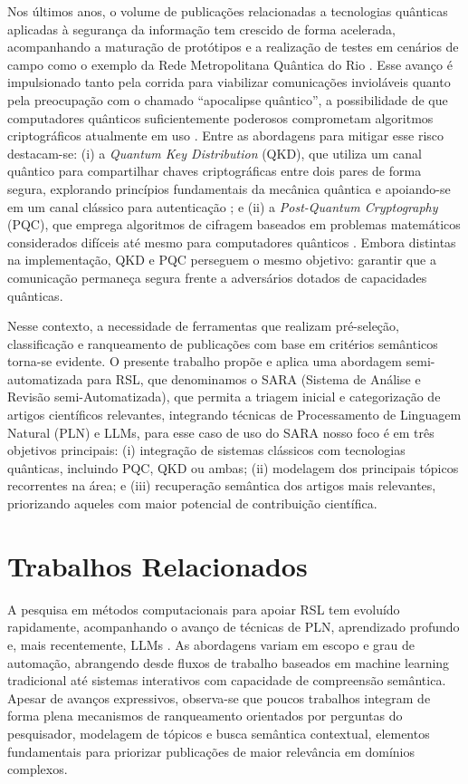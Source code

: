 \documentclass{siintec}
\begin{document}
Nos últimos anos, o volume de publicações relacionadas a tecnologias quânticas aplicadas à segurança da informação tem crescido de forma acelerada, acompanhando a maturação de protótipos e a realização de testes em cenários de campo como o exemplo da Rede Metropolitana Quântica do Rio \cite{temporao2024rio}. Esse avanço é impulsionado tanto pela corrida para viabilizar comunicações invioláveis quanto pela preocupação com o chamado “apocalipse quântico”, a possibilidade de que computadores quânticos suficientemente poderosos comprometam algoritmos criptográficos atualmente em uso \cite{abughanem2025ibm}. Entre as abordagens para mitigar esse risco destacam-se: (i) a \textit{Quantum Key Distribution} (QKD), que utiliza um canal quântico para compartilhar chaves criptográficas entre dois pares de forma segura, explorando princípios fundamentais da mecânica quântica e apoiando-se em um canal clássico para autenticação \cite{qi2021bennett}; e (ii) a \textit{Post-Quantum Cryptography} (PQC), que emprega algoritmos de cifragem baseados em problemas matemáticos considerados difíceis até mesmo para computadores quânticos \cite{alagic2022status}. Embora distintas na implementação, QKD e PQC perseguem o mesmo objetivo: garantir que a comunicação permaneça segura frente a adversários dotados de capacidades quânticas.

Nesse contexto, a necessidade de ferramentas que realizam pré-seleção, classificação e ranqueamento de publicações com base em critérios semânticos torna-se evidente. O presente trabalho propõe e aplica uma abordagem semi-automatizada para RSL, que denominamos o SARA (Sistema de Análise e Revisão semi-Automatizada), que permita a triagem inicial e categorização de artigos científicos relevantes, integrando técnicas de Processamento de Linguagem Natural (PLN) e LLMs, para esse caso de uso do SARA nosso foco é em três objetivos principais: (i) integração de sistemas clássicos com tecnologias quânticas, incluindo PQC, QKD ou ambas; (ii) modelagem dos principais tópicos recorrentes na área; e (iii) recuperação semântica dos artigos mais relevantes, priorizando aqueles com maior potencial de contribuição científica.

\section{Trabalhos Relacionados}

A pesquisa em métodos computacionais para apoiar RSL tem evoluído rapidamente, acompanhando o avanço de técnicas de PLN, aprendizado profundo e, mais recentemente, LLMs \cite{galli2025large}. As abordagens variam em escopo e grau de automação, abrangendo desde fluxos de trabalho baseados em machine learning tradicional até sistemas interativos com capacidade de compreensão semântica. Apesar de avanços expressivos, observa-se que poucos trabalhos integram de forma plena mecanismos de ranqueamento orientados por perguntas do pesquisador, modelagem de tópicos e busca semântica contextual, elementos fundamentais para priorizar publicações de maior relevância em domínios complexos.
\end{document}

